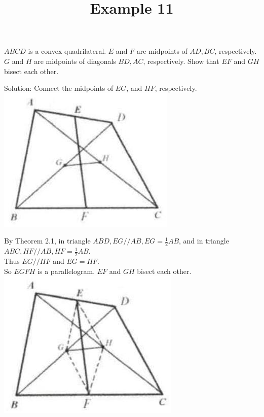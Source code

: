 \documentclass{article}
\title{Example 11}
\date{}
\begin{document}
\maketitle

\(A B C D\) is a convex quadrilateral. \(E\) and \(F\) are midpoints of \(A D, B C\), respectively. \(G\) and \(H\) are midpoints of diagonals \(B D, A C\), respectively. Show that \(E F\) and \(G H\) bisect each other.

Solution:
Connect the midpoints of \(E G\), and \(H F\), respectively.\\
\centering
\includegraphics[width=\textwidth]{images/problem_image_1.jpg}

By Theorem 2.1, in triangle \(A B D, E G / / A B, E G=\frac{1}{2} A B\), and in triangle \(A B C, H F / / A B, H F=\frac{1}{2} A B\).\\
Thus \(E G / / H F\) and \(E G=H F\).\\
So \(E G F H\) is a parallelogram. \(E F\) and \(G H\) bisect each other.\\
\centering
\includegraphics[width=\textwidth]{images/reasoning_image_1.jpg}
\end{document}

